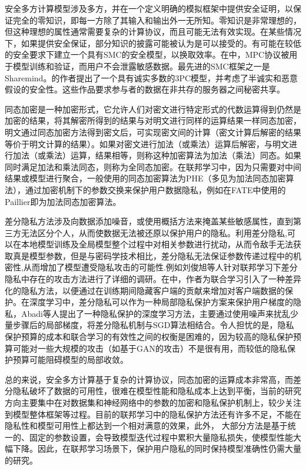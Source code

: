 安全多方计算模型涉及多方，并在一个定义明确的模拟框架中提供安全证明，以保证完全的零知识，即每一方除了其输入和输出外一无所知。零知识是非常理想的，但这种理想的属性通常需要复杂的计算协议，而且可能无法有效实现。在某些情况下，如果提供安全保证，部分知识的披露可能被认为是可以接受的。有可能在较低的安全要求下建立一个具有SMC的安全模型，以换取效率\cite{ref14}。在\cite{ref15}中，MPC协议被用于模型训练和验证，而用户不会泄露敏感数据。最先进的SMC框架之一是Sharemind\cite{ref16}。\cite{ref17}的作者提出了一个具有诚实多数的3PC模型\cite{ref18}，并考虑了半诚实和恶意假设的安全性。这些作品要求参与者的数据在非共存的服务器之间秘密共享。

同态加密是一种加密形式，它允许人们对密文进行特定形式的代数运算得到仍然是加密的结果，将其解密所得到的结果与对明文进行同样的运算结果一样同态加密\cite{ref19}，明文通过同态加密方法得到密文后，可实现密文间的计算（密文计算后解密的结果等价于明文计算的结果）。如果对密文进行加法（或乘法）运算后解密，与明文进行加法（或乘法）运算，结果相等，则称这种加密算法为加法（乘法）同态。如果同时满足加法和乘法同态，则称为全同态加密。在联邦学习中，因为只需要对中间结果或模型进行聚合，一般使用的同态加密算法为PHE（多见为加法同态加密算法），通过加密机制下的参数交换来保护用户数据隐私\cite{ref20}，例如在FATE中使用的Paillier即为加法同态加密算法。

差分隐私方法涉及向数据添加噪音，或使用概括方法来掩盖某些敏感属性，直到第三方无法区分个人，从而使数据无法被还原以保护用户的隐私。利用差分隐私,可以在本地模型训练及全局模型整个过程中对相关参数进行扰动，从而令敌手无法获取真是模型参数，但是与密码学技术相比，差分隐私无法保证参数传递过程中的机密性,从而增加了模型遭受隐私攻击的可能性.例如刘俊旭等人\cite{ref21}针对联邦学习下差分隐私中存在的攻击方法进行了详细的调研。在\cite{ref22}中，作者为联合学习引入了一种差异化的隐私方法，以便通过在训练期间隐藏客户端的贡献来增加对客户端数据的保护。在深度学习中，差分隐私可以作为一种局部隐私保护方案来保护用户梯度的隐私，Abadi等人\cite{ref23}提出了一种隐私保护的深度学习方法，主要通过使用噪声来扰乱少量步骤后的局部梯度，将差分隐私机制与SGD算法相结合。令人担忧的是，隐私保护预算的成本和联合学习的有效性之间的权衡是困难的，因为较高的隐私保护预算可能对一些大规模的攻击（如基于GAN的攻击）不是很有用\cite{ref24}，而较低的隐私保护预算可能阻碍模型的局部收敛。


总的来说，安全多方计算基于复杂的计算协议，同态加密的运算成本非常高，而差分隐私破坏了数据的可用性，很难在模型性能和隐私成本上达到平衡，当前的研究方向主要集中在对数据集和神经网络中的参数的加密和隐私保护机制上，较少关注到模型整体框架等过程。目前的联邦学习中的隐私保护方法还有许多不足，不能在隐私性和模型可用性上都达到一个相对满意的效果，此外， 大部分方法是基于统一的、固定的参数设置，会导致模型迭代过程中累积大量隐私损失，使模型性能大幅下降。因此，在联邦学习场景下，保护用户隐私的同时保持模型准确性仍需大量的研究。


